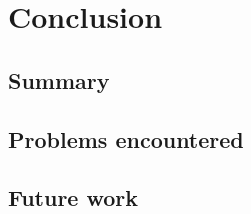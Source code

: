  \cleardoublepage
\chapter{Conclusion}

\section{Summary}

\section{Problems encountered}

\section{Future work}